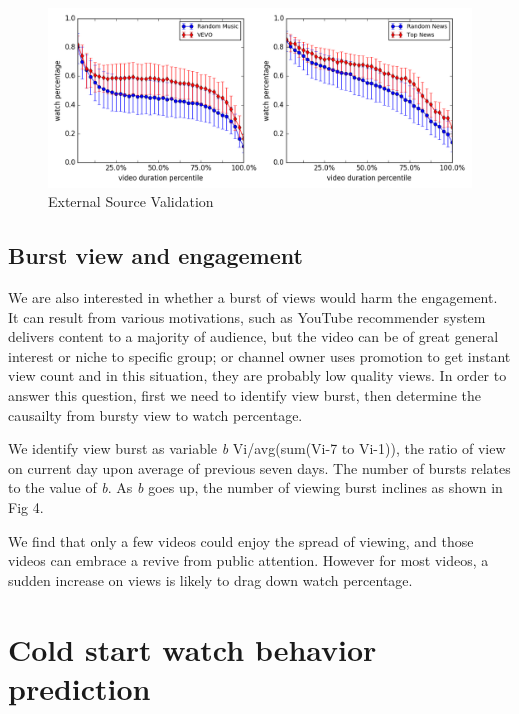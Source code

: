 \begin{figure}
    \centering
    \includegraphics[scale=0.32]{image/external_source_comp.png}
    \caption{External Source Validation}
\end{figure}

\subsection{Burst view and engagement}

We are also interested in whether a burst of views would harm the engagement. It can result from various motivations, such as YouTube recommender system delivers content to a majority of audience, but the video can be of great general interest or niche to specific group; or channel owner uses promotion to get instant view count and in this situation, they are probably low quality views. In order to answer this question, first we need to identify view burst, then determine the causailty from bursty view to watch percentage.

We identify view burst as variable \textit{b} Vi/avg(sum(Vi-7 to Vi-1)), the ratio of view on current day upon average of previous seven days. The number of bursts relates to the value of \textit{b}. As \textit{b} goes up, the number of viewing burst inclines as shown in Fig 4.

We find that only a few videos could enjoy the spread of viewing, and those videos can embrace a revive from public attention. However for most videos, a sudden increase on views is likely to drag down watch percentage.


\section{Cold start watch behavior prediction}

